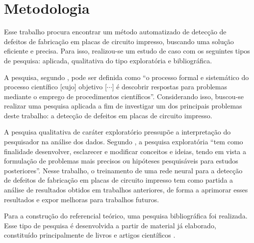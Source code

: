 \chapter{Metodologia}

Esse trabalho procura encontrar um método automatizado de detecção de defeitos de fabricação em placas de circuito impresso, buscando uma solução eficiente e precisa. Para isso, realizou-se um estudo de caso com os seguintes tipos de pesquisa: aplicada, qualitativa do tipo exploratória e bibliográfica.

A pesquisa, segundo , pode ser definida como ``o processo formal e sistemático do processo científico [cujo] objetivo [$\cdots$] é descobrir respostas para problemas mediante o emprego de procedimentos científicos''. Considerando isso, buscou-se realizar uma pesquisa aplicada a fim de investigar um dos principais problemas deste trabalho: a detecção de defeitos em placas de circuito impresso.

A pesquisa qualitativa de caráter exploratório pressupõe a interpretação do pesquisador na análise dos dados. Segundo , a pesquisa exploratória ``tem como finalidade desenvolver, esclarecer e modificar conceitos e ideias, tendo em vista a formulação de problemas mais precisos ou hipóteses pesquisáveis para estudos posteriores''. Nesse trabalho, o treinamento de uma rede neural para a detecção de defeitos de fabricação em placas de circuito impresso tem como partida a análise de resultados obtidos em trabalhos anteriores, de forma a aprimorar esses resultados e expor melhoras para trabalhos futuros.

Para a construção do referencial teórico, uma pesquisa bibliográfica foi realizada. Esse tipo de pesquisa é desenvolvida a partir de material já elaborado, constituído principalmente de livros e artigos científicos \cite{ref:Gil}.
